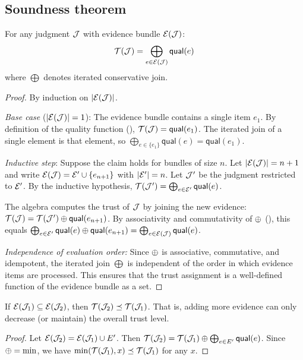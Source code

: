 \documentclass[11pt]{article}
\begin{document}
\subsection{Soundness theorem}

\begin{theorem}\label{thm:soundness}
For any judgment $\mathcal{J}$ with evidence bundle $\mathcal{E}(\mathcal{J})$:
\[
  \mathcal{T}(\mathcal{J}) =
  \bigoplus_{e \in \mathcal{E}(\mathcal{J})} \mathsf{qual}(e)
\]
where $\bigoplus$ denotes iterated conservative join.
\end{theorem}

\begin{proof}
By induction on $|\mathcal{E}(\mathcal{J})|$.

\emph{Base case} ($|\mathcal{E}(\mathcal{J})| = 1$):
The evidence bundle contains a single item $e_1$.
By definition of the quality function (),
$\mathcal{T}(\mathcal{J}) = \mathsf{qual}(e_1)$.
The iterated join of a single element is that element, so
$\bigoplus_{e \in \{e_1\}} \mathsf{qual}(e) = \mathsf{qual}(e_1)$.

\emph{Inductive step}:
Suppose the claim holds for bundles of size $n$.
Let $|\mathcal{E}(\mathcal{J})| = n+1$ and write
$\mathcal{E}(\mathcal{J}) = \mathcal{E}' \cup \{e_{n+1}\}$ with $|\mathcal{E}'| = n$.
Let $\mathcal{J}'$ be the judgment restricted to $\mathcal{E}'$.
By the inductive hypothesis,
$\mathcal{T}(\mathcal{J}') = \bigoplus_{e \in \mathcal{E}'} \mathsf{qual}(e)$.

The algebra computes the trust of $\mathcal{J}$ by joining the new
evidence:
$\mathcal{T}(\mathcal{J}) = \mathcal{T}(\mathcal{J}') \oplus \mathsf{qual}(e_{n+1})$.
By associativity and commutativity of $\oplus$
(), this equals
$\bigoplus_{e \in \mathcal{E}'} \mathsf{qual}(e) \oplus
\mathsf{qual}(e_{n+1})
= \bigoplus_{e \in \mathcal{E}(\mathcal{J})} \mathsf{qual}(e)$.

\emph{Independence of evaluation order:}
Since $\oplus$ is associative, commutative, and idempotent,
the iterated join $\bigoplus$ is independent of the order
in which evidence items are processed.  This ensures that
the trust assignment is a well-defined function of the evidence
bundle as a set.
\end{proof}

\begin{lemma}\label{lem:trust-monotone}
If $\mathcal{E}(\mathcal{J}_1) \subseteq \mathcal{E}(\mathcal{J}_2)$, then
$\mathcal{T}(\mathcal{J}_2) \preceq \mathcal{T}(\mathcal{J}_1)$.
That is, adding more evidence can only decrease (or maintain)
the overall trust level.
\end{lemma}

\begin{proof}
Let $\mathcal{E}(\mathcal{J}_2) = \mathcal{E}(\mathcal{J}_1) \cup E'$.  Then
$\mathcal{T}(\mathcal{J}_2) = \mathcal{T}(\mathcal{J}_1) \oplus \bigoplus_{e \in E'}
\mathsf{qual}(e)$.  Since $\oplus = \min$, we have
$\min(\mathcal{T}(\mathcal{J}_1), x) \preceq \mathcal{T}(\mathcal{J}_1)$ for any $x$.
\end{proof}
\end{document}
